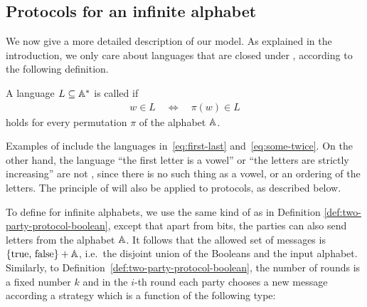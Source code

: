 


\subsection{Protocols for an infinite alphabet}
\label{sec:protocols-infinite-alphabet}
\AP
We now give a more detailed description of our model. 
As explained in the introduction, we only care about languages that are closed 
under , according to the following definition. 

\begin{definition} \label{def:equivariant-language}
  \AP
  A language $L \subseteq \mathbb A^*$ is called  if 
  \begin{align*}
  w \in L \quad \iff \quad \pi(w) \in L
  \end{align*}
  holds for every permutation $\pi$ of the alphabet $\mathbb A$.
\end{definition}

Examples of  include the languages
in~\eqref{eq:first-last} and~\eqref{eq:some-twice}. On the other hand, the
language ``the first letter is a vowel'' or ``the letters are strictly
increasing'' are not , since there is no such thing as a vowel,
or an ordering of the letters. The principle of  will also be applied to protocols, as described below.


\AP To define  for infinite alphabets, we use the
same kind of  as in Definition \ref{def:two-party-protocol-boolean},
except that apart from bits, the parties can also send letters from the
alphabet $\mathbb A$. It follows that the allowed set of messages is
$\{\text{true, false}\} + \mathbb A$, i.e.~the disjoint union of the Booleans
and the input alphabet. Similarly, to
Definition~\ref{def:two-party-protocol-boolean}, the number of rounds is a
fixed number $k$ and in the $i$-th round each party chooses a new message
according a strategy which is a function of the following type: 

